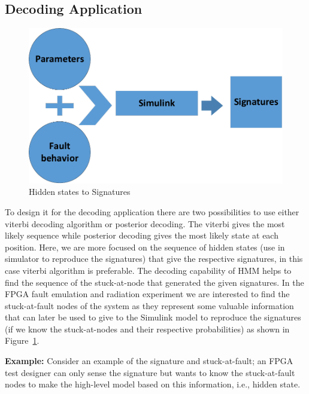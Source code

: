 \subsection{Decoding Application}


\begin{figure}[tb!]

 \centering
  \captionsetup{justification=centering}    
   \includegraphics[scale=0.8]{Figures/fromhiddentosignature.pdf}
   \caption{Hidden states to Signatures}
\label{fig:HMMsig}
\end{figure}


To design it for the decoding application there are two possibilities to use either viterbi decoding algorithm or posterior decoding. The viterbi gives the most likely sequence while posterior decoding gives the most likely state at each position. Here, we are more focused on the sequence of hidden states (use in simulator to reproduce the signatures) that give the respective signatures, in this case viterbi algorithm is preferable. The decoding capability of HMM helps to find the sequence of the stuck-at-node that generated the given signatures. In the FPGA fault emulation and radiation experiment we are interested to find the stuck-at-fault nodes of the system as they represent some valuable information that can later be used to give to the Simulink model to reproduce the signatures (if we know the stuck-at-nodes and their respective probabilities) as shown in Figure~\ref{fig:HMMsig}.




 
\textbf{Example:} Consider an example of the signature and stuck-at-fault; an FPGA test designer can only sense the signature but wants to know the stuck-at-fault nodes to make the high-level model based on this information, i.e., hidden state. 

